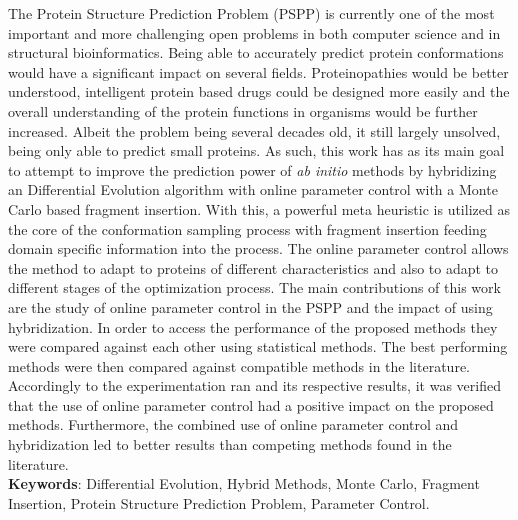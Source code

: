 \begin{resumo}
The Protein Structure Prediction Problem (PSPP) is currently one of the most important and more challenging open problems
in both computer science and in structural bioinformatics. Being able to accurately predict protein conformations
would have a significant impact on several fields. Proteinopathies would be better understood, intelligent protein
based drugs could be designed more easily and the overall understanding of the protein functions in organisms would
be further increased. Albeit the problem being several decades old, it still largely unsolved, being only able to
predict small proteins. As such, this work has as its main goal to attempt to improve the prediction power of
\textit{ab initio} methods by hybridizing an Differential Evolution algorithm with online parameter control with
a Monte Carlo based fragment insertion. With this, a powerful meta heuristic is utilized as the core of the
conformation sampling process with fragment insertion feeding domain specific information into the process. The
online parameter control allows the method to adapt to proteins of different characteristics and also to adapt
to different stages of the optimization process. The main contributions of this work are the study of online parameter
control in the PSPP and the impact of using hybridization. In order to access the performance of the proposed methods
they were compared against each other using statistical methods. The best performing methods were then compared against
compatible methods in the literature. Accordingly to the experimentation ran and its respective results, it was
verified that the use of online parameter control had a positive impact on the proposed methods. Furthermore, the
combined use of online parameter control and hybridization led to better results than competing methods found
in the literature.
 \\ 
 \vspace{\onelineskip}
 \noindent
 \textbf{Keywords}: Differential Evolution, Hybrid Methods, Monte Carlo, Fragment Insertion, Protein Structure Prediction Problem, Parameter Control.
\end{resumo}



